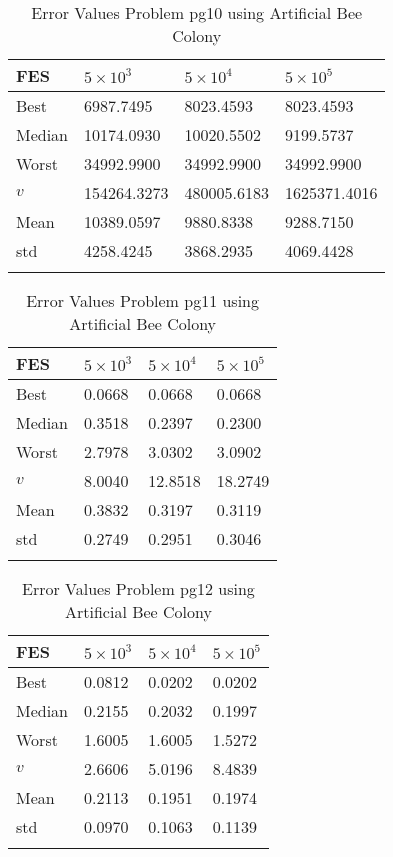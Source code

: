 \documentclass[10pt, a4paper]{book}
\begin{document}
\begin{center}
\begin{longtable}{l l l l}
FES & $5 \times 10^{3}$ & $5 \times 10^{4}$ & $5 \times 10^{5}$ \\
\hline
Best & 6987.7495 & 8023.4593 & 8023.4593 \\
Median & 10174.0930 & 10020.5502 & 9199.5737 \\
Worst & 34992.9900 & 34992.9900 & 34992.9900 \\
$v$ & 154264.3273 & 480005.6183 & 1625371.4016 \\
Mean & 10389.0597 & 9880.8338 & 9288.7150 \\
std & 4258.4245 & 3868.2935 & 4069.4428 \\
\caption{ Error Values Problem pg10 using Artificial Bee Colony }
\end{longtable}
\end{center}

\begin{center}
\begin{longtable}{l l l l}
FES & $5 \times 10^{3}$ & $5 \times 10^{4}$ & $5 \times 10^{5}$ \\
\hline
Best & 0.0668 & 0.0668 & 0.0668 \\
Median & 0.3518 & 0.2397 & 0.2300 \\
Worst & 2.7978 & 3.0302 & 3.0902 \\
$v$ & 8.0040 & 12.8518 & 18.2749 \\
Mean & 0.3832 & 0.3197 & 0.3119 \\
std & 0.2749 & 0.2951 & 0.3046 \\
\caption{ Error Values Problem pg11 using Artificial Bee Colony }
\end{longtable}
\end{center}

\begin{center}
\begin{longtable}{l l l l}
FES & $5 \times 10^{3}$ & $5 \times 10^{4}$ & $5 \times 10^{5}$ \\
\hline
Best & 0.0812 & 0.0202 & 0.0202 \\
Median & 0.2155 & 0.2032 & 0.1997 \\
Worst & 1.6005 & 1.6005 & 1.5272 \\
$v$ & 2.6606 & 5.0196 & 8.4839 \\
Mean & 0.2113 & 0.1951 & 0.1974 \\
std & 0.0970 & 0.1063 & 0.1139 \\
\caption{ Error Values Problem pg12 using Artificial Bee Colony }
\end{longtable}
\end{center}
\end{document}
